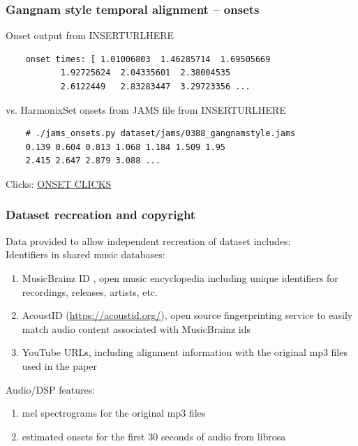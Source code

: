 \documentclass{beamer}
\begin{document}
\begin{frame}[fragile]
	\frametitle{Gangnam style temporal alignment -- onsets}
	Onset output from INSERTURLHERE
	\begin{verbatim}
	onset times: [ 1.01006803  1.46285714  1.69505669 
	       1.92725624  2.04335601  2.38004535
	       2.6122449   2.83283447  3.29723356 ...
	\end{verbatim}
	vs. HarmonixSet onsets from JAMS file from INSERTURLHERE
	\begin{verbatim}
	# ./jams_onsets.py dataset/jams/0388_gangnamstyle.jams
	0.139 0.604 0.813 1.068 1.184 1.509 1.95
	2.415 2.647 2.879 3.088 ...
	\end{verbatim}
	Clicks: \href{run:./gangnam_onsets.wav}{ONSET CLICKS}
\end{frame}


\begin{frame}
	\frametitle{Dataset recreation and copyright}
	Data provided to allow independent recreation of dataset includes:\\
	Identifiers in shared music databases:
	\begin{enumerate}
		\item
			MusicBrainz ID , open music encyclopedia including unique identifiers for recordings, releases, artists, etc.
		\item
			AcoustID (\href{https://acoustid.org/}{https://acoustid.org/}), open source fingerprinting service to easily match audio content associated with MusicBrainz ids
		\item
			YouTube URLs, including alignment information with the original mp3 files used in the paper
	\end{enumerate}
	Audio/DSP features:
	\begin{enumerate}
		\item
			mel spectrograms for the original mp3 files
		\item
			estimated onsets for the first 30 seconds of audio from librosa
	\end{enumerate}
\end{frame}

\end{document}
